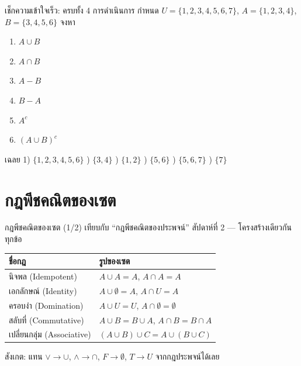 \begin{frame}{เช็กความเข้าใจเร็ว: ครบทั้ง 4 การดำเนินการ}
  กำหนด $U = \{1, 2, 3, 4, 5, 6, 7\}$, \quad $A = \{1, 2, 3, 4\}$, \quad $B = \{3, 4, 5, 6\}$ จงหา
  \begin{enumerate}
    \item $A \cup B$
    \item $A \cap B$
    \item $A - B$
    \item $B - A$
    \item $A^c$
    \item $(A \cup B)^c$
  \end{enumerate}
  \pause
  \begin{exampleblock}{เฉลย}
    \footnotesize
    1) $\{1,2,3,4,5,6\}$ ) $\{3,4\}$ ) $\{1,2\}$ ) $\{5,6\}$ ) $\{5,6,7\}$ ) $\{7\}$
  \end{exampleblock}
\end{frame}


\section{กฎพีชคณิตของเซต}

\begin{frame}{กฎพีชคณิตของเซต (1/2)}
  เทียบกับ ``กฎพีชคณิตของประพจน์'' สัปดาห์ที่ 2 --- โครงสร้างเดียวกันทุกข้อ
  \begin{center}\small
  \begin{tabular}{|l|l|}
    \hline
    \textbf{ชื่อกฎ} & \textbf{รูปของเซต} \\ \hline
    นิจพล (Idempotent) & $A \cup A = A$, \quad $A \cap A = A$ \\ \hline
    เอกลักษณ์ (Identity) & $A \cup \emptyset = A$, \quad $A \cap U = A$ \\ \hline
    ครอบงำ (Domination) & $A \cup U = U$, \quad $A \cap \emptyset = \emptyset$ \\ \hline
    สลับที่ (Commutative) & $A \cup B = B \cup A$, \quad $A \cap B = B \cap A$ \\ \hline
    เปลี่ยนกลุ่ม (Associative) & $(A \cup B) \cup C = A \cup (B \cup C)$ \\ \hline
  \end{tabular}
  \end{center}
  \vspace{0.3em}
  \footnotesize สังเกต: แทน $\lor \to \cup$, $\land \to \cap$, $F \to \emptyset$, $T \to U$ จากกฎประพจน์ได้เลย
\end{frame}

